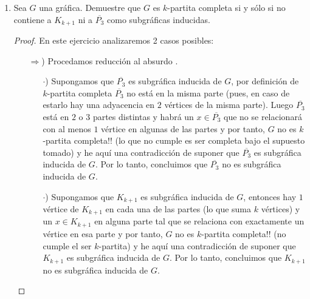 \documentclass{article}
\begin{document}
\begin{enumerate}
\begin{proof}
    \textcolor{blue}{Caso 2:} Si $G$ es un \'arbol, esto nos indica que $G$ es
    $1-$conexa, y es por eso que se considera este caso como el m\'inimo para el
    que se cumplir\'a la condici\'on a demostrar. Sabemos por el teorema de
    caracterizaci\'on de \'arboles que cada arista en $G$ ser\'a un puente, y
    por el resultado previamente mostrado sabemos que existe una trayectoria $T$
    en $G$ de orden exactamente $3$, as\'i $T$ es claramente $P_3$ y concluimos
    $P_3$ es subg\'afica inducida de $G$.
    
    De los casos anteriores concluimos que el enunciado es verdadero.
  \end{proof}
  
\item {} Sea $G$ una gr\'afica. Demuestre que $G$
  es $k$-partita completa si y s\'olo si no contiene a $K_{k+1}$ ni a $\overline{P_3}$
  como subgr\'aficas inducidas.
  
  \begin{proof}
    En este ejercicio analizaremos 2 casos posibles:

    \begin{itemize}
    \item[$\Rightarrow$)] Procedamos reducción al absurdo .

      \begin{itemize}
      \item[$\cdot$)] Supongamos que $\overline{P_3}$ es subgr\'afica inducida
        de $G$, por definición de $k$-partita completa $\overline{P_3}$ no está
        en la misma parte (pues, en caso de estarlo hay una adyacencia en $2$
        vértices de la misma parte). Luego $\overline{P_3}$ está en $2$ o $3$
        partes distintas y habrá un $x \in \overline{P_3}$ que no se relacionará
        con al menos $1$ vértice en algunas de las partes y por tanto, $G$ no es
        $k$-partita completa!! (lo que no cumple es ser completa bajo el supuesto
        tomado) y he aquí una contradicción de suponer que $\overline{P_3}$ es
        subgr\'afica inducida de $G$. Por lo tanto, concluimos que $\overline{P_3}$
        no es subgr\'afica inducida de $G$.
        
      \item[$\cdot$)] Supongamos que $K_{k + 1}$ es subgr\'afica inducida de $G$,
        entonces hay $1$ vértice de $K_{k + 1}$ en cada una de las partes (lo que
        suma $k$ v\'ertices) y un $x \in K_{k + 1}$ en alguna parte tal que se
        relaciona con exactamente un v\'ertice en esa parte y por tanto, $G$ no
        es $k$-partita completa!! (no cumple el ser $k$-partita) y he aquí una
        contradicción de suponer que $K_{k + 1}$ es subgr\'afica inducida de $G$.
        Por lo tanto, concluimos que $K_{k + 1}$ no es subgr\'afica inducida de $G$.
        

\end{itemize}
\end{itemize}
\end{proof}
\end{enumerate}
\end{document}
